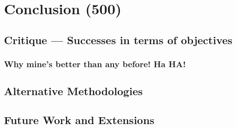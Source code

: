 \chapter{Conclusion (500)}
\section{Critique --- Successes in terms of objectives}
\subsection{Why mine's better than any before! Ha HA!}
\section{Alternative Methodologies}
\section{Future Work and Extensions}

